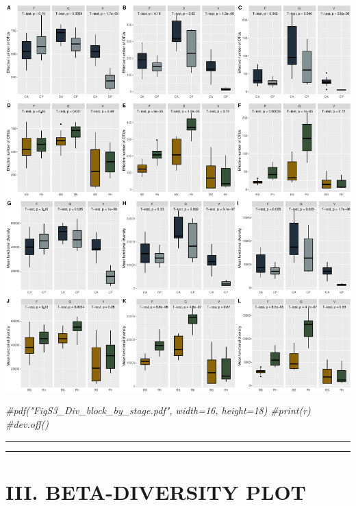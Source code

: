 \documentclass[]{interact}
\theoremstyle{plain}%
\theoremstyle{definition}
\theoremstyle{remark}
\newenvironment{Shaded}{\begin{snugshade}}{\end{snugshade}}
\newcommand{\CommentTok}[1]{\textcolor[rgb]{0.56,0.35,0.01}{\textit{#1}}}
\begin{document}
\begin{center}\includegraphics{Doc_pdf_files/figure-latex/unnamed-chunk-14-1} \end{center}

\begin{Shaded}
\begin{Highlighting}[]
\CommentTok{\#pdf("FigS3\_Div\_block\_by\_stage.pdf", width=16, height=18)}
\CommentTok{\#print(r)}
\CommentTok{\#dev.off()}
\end{Highlighting}
\end{Shaded}

\begin{center}\rule{0.5\linewidth}{0.5pt}\end{center}

\begin{center}\rule{0.5\linewidth}{0.5pt}\end{center}

\hypertarget{iii.-beta-diversity-plot}{%
\section{III. BETA-DIVERSITY PLOT}\label{iii.-beta-diversity-plot}}
\end{document}
